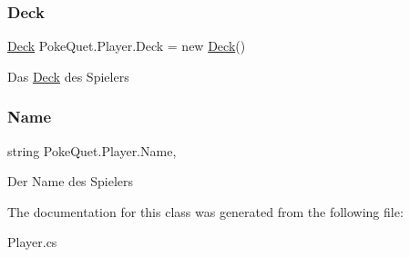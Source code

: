 \subsubsection{\texorpdfstring{Deck}{Deck}}
{\footnotesize\ttfamily \mbox{\hyperlink{class_poke_quet_1_1_deck}{Deck}} Poke\+Quet.\+Player.\+Deck = new \mbox{\hyperlink{class_poke_quet_1_1_deck}{Deck}}()\hspace{0.3cm}{\ttfamily [get]}}



Das \mbox{\hyperlink{class_poke_quet_1_1_deck}{Deck}} des Spielers 

\mbox{\label{class_poke_quet_1_1_player_a2ccd0df63845bdec5e75d80df2748ab5}} 
\subsubsection{\texorpdfstring{Name}{Name}}
{\footnotesize\ttfamily string Poke\+Quet.\+Player.\+Name\hspace{0.3cm}{\ttfamily [get]}, {\ttfamily [set]}}



Der Name des Spielers 



The documentation for this class was generated from the following file\+:\begin{DoxyCompactItemize}
\item 
Player.\+cs\end{DoxyCompactItemize}
